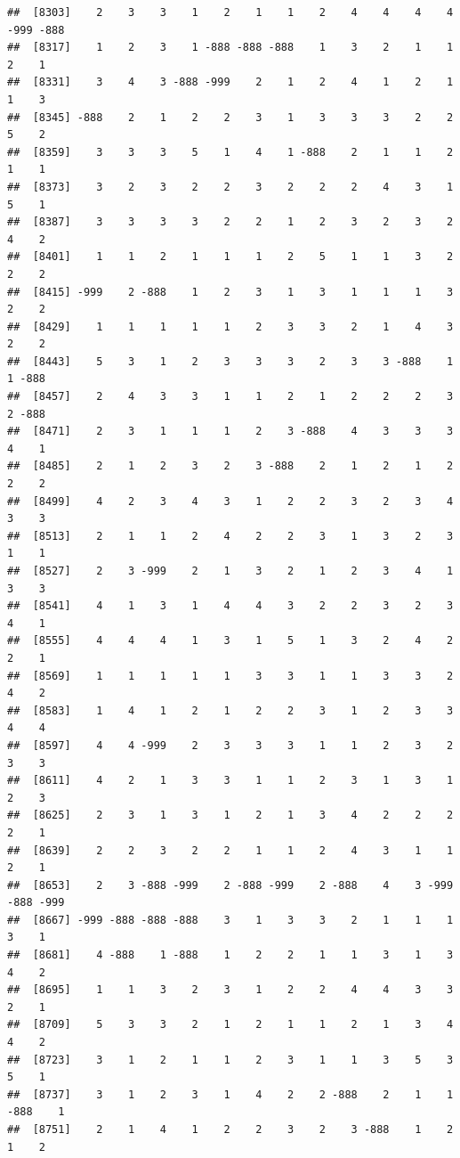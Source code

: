 \documentclass[
  12pt,
  openany]{book}
\begin{document}
\begin{verbatim}
##  [8303]    2    3    3    1    2    1    1    2    4    4    4    4 -999 -888
##  [8317]    1    2    3    1 -888 -888 -888    1    3    2    1    1    2    1
##  [8331]    3    4    3 -888 -999    2    1    2    4    1    2    1    1    3
##  [8345] -888    2    1    2    2    3    1    3    3    3    2    2    5    2
##  [8359]    3    3    3    5    1    4    1 -888    2    1    1    2    1    1
##  [8373]    3    2    3    2    2    3    2    2    2    4    3    1    5    1
##  [8387]    3    3    3    3    2    2    1    2    3    2    3    2    4    2
##  [8401]    1    1    2    1    1    1    2    5    1    1    3    2    2    2
##  [8415] -999    2 -888    1    2    3    1    3    1    1    1    3    2    2
##  [8429]    1    1    1    1    1    2    3    3    2    1    4    3    2    2
##  [8443]    5    3    1    2    3    3    3    2    3    3 -888    1    1 -888
##  [8457]    2    4    3    3    1    1    2    1    2    2    2    3    2 -888
##  [8471]    2    3    1    1    1    2    3 -888    4    3    3    3    4    1
##  [8485]    2    1    2    3    2    3 -888    2    1    2    1    2    2    2
##  [8499]    4    2    3    4    3    1    2    2    3    2    3    4    3    3
##  [8513]    2    1    1    2    4    2    2    3    1    3    2    3    1    1
##  [8527]    2    3 -999    2    1    3    2    1    2    3    4    1    3    3
##  [8541]    4    1    3    1    4    4    3    2    2    3    2    3    4    1
##  [8555]    4    4    4    1    3    1    5    1    3    2    4    2    2    1
##  [8569]    1    1    1    1    1    3    3    1    1    3    3    2    4    2
##  [8583]    1    4    1    2    1    2    2    3    1    2    3    3    4    4
##  [8597]    4    4 -999    2    3    3    3    1    1    2    3    2    3    3
##  [8611]    4    2    1    3    3    1    1    2    3    1    3    1    2    3
##  [8625]    2    3    1    3    1    2    1    3    4    2    2    2    2    1
##  [8639]    2    2    3    2    2    1    1    2    4    3    1    1    2    1
##  [8653]    2    3 -888 -999    2 -888 -999    2 -888    4    3 -999 -888 -999
##  [8667] -999 -888 -888 -888    3    1    3    3    2    1    1    1    3    1
##  [8681]    4 -888    1 -888    1    2    2    1    1    3    1    3    4    2
##  [8695]    1    1    3    2    3    1    2    2    4    4    3    3    2    1
##  [8709]    5    3    3    2    1    2    1    1    2    1    3    4    4    2
##  [8723]    3    1    2    1    1    2    3    1    1    3    5    3    5    1
##  [8737]    3    1    2    3    1    4    2    2 -888    2    1    1 -888    1
##  [8751]    2    1    4    1    2    2    3    2    3 -888    1    2    1    2

\end{verbatim}
\end{document}
